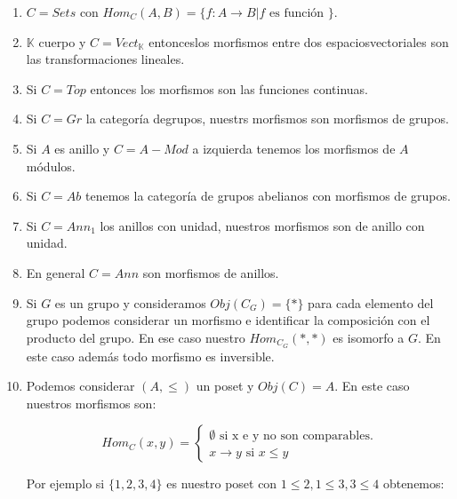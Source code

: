 \documentclass{article}
\newcommand{\conjunto}[1]{\ensuremath{\{#1\}}}
\newcommand{\cuerpo}{\mathbb{K}}
\theoremstyle{plain}
\theoremstyle{definition}
\theoremstyle{remark}
\begin{document}
\begin{enumerate}
    \item $C = Sets$ con $Hom_C(A,B) = \conjunto{f:A \to B| f \text{ es función }}$.

    \item $\cuerpo$ cuerpo y $C = Vect_{\cuerpo}$ entonceslos morfismos entre dos espaciosvectoriales son las transformaciones lineales.
    
    \item Si $C = Top$ entonces los morfismos son las funciones continuas.
    
    \item Si $C = Gr$ la categoría degrupos, nuestrs morfismos son morfismos de grupos.

    \item Si $A$ es anillo y $C = A-Mod$ a izquierda tenemos los morfismos de $A$ módulos.
    
    \item Si $C = Ab$ tenemos la categoría de grupos abelianos con morfismos de grupos.

    \item Si $C = Ann_1$ los anillos con unidad, nuestros morfismos son de anillo con unidad.

    \item En general $C = Ann$ son morfismos de anillos.
    
    \item Si $G$ es un grupo y consideramos $Obj(C_G) = \conjunto{*}$ para cada elemento del grupo podemos considerar un morfismo e identificar la composición con el producto del grupo. En ese caso nuestro $Hom_{C_G}(*,*)$ es isomorfo a $G$. En este caso además todo morfismo es inversible.

    \item Podemos considerar $(A,\leq)$ un poset y $Obj(C) = A$. En este caso nuestros morfismos son:

    \begin{equation*}
        Hom_{C}(x,y) =
        \begin{cases}
            \emptyset \text{ si x e y no son comparables.} \\
            x \to y \text{ si } x\leq y
        \end{cases}
    \end{equation*}

    Por ejemplo si $\conjunto{1,2,3,4}$ es nuestro poset con $1 \leq 2, 1 \leq 3, 3 \leq 4$ obtenemos:

\begin{center}
\end{center}

\end{enumerate}
\end{document}
